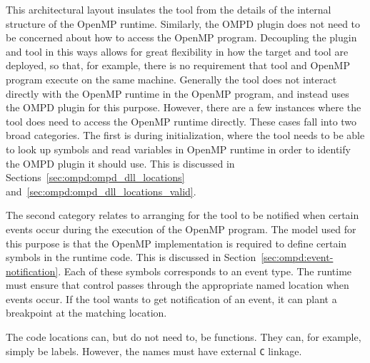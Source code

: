 This architectural layout insulates the tool from the details
of the internal structure of the OpenMP runtime.
Similarly, the OMPD plugin does not need to be concerned about
how to access the OpenMP program.
Decoupling the plugin and tool in this ways allows for
great flexibility in how the target and tool are deployed,
so that, for example, there is no requirement that tool
and OpenMP program execute on the same machine.
Generally the tool does not interact directly with the OpenMP
runtime in the OpenMP program, and instead uses the OMPD plugin
for this purpose.
However, there are a few instances where the tool does need
to access the OpenMP runtime directly.
These cases fall into two broad categories.
The first is during initialization, where the tool needs
to be able to look up symbols and read variables in OpenMP runtime
in order to identify the OMPD plugin it should use.
This is discussed in Sections~\ref{sec:ompd:ompd_dll_locations}
and~\ref{sec:ompd:ompd_dll_locations_valid}.

The second category relates to arranging for the tool to be notified
when certain events occur during the execution of the OpenMP program.
The model used for this purpose is that the OpenMP implementation
is required to define certain symbols in the runtime code.
This is discussed in Section~\ref{sec:ompd:event-notification}.
Each of these symbols corresponds to an event type.
The runtime must ensure that control passes through the appropriate
named location when events occur.
If the tool wants to get notification of an event, it can plant
a breakpoint at the matching location.

The code locations can, but do not need to, be functions.
They can, for example, simply be labels.
However, the names must have external \texttt{C} linkage.

